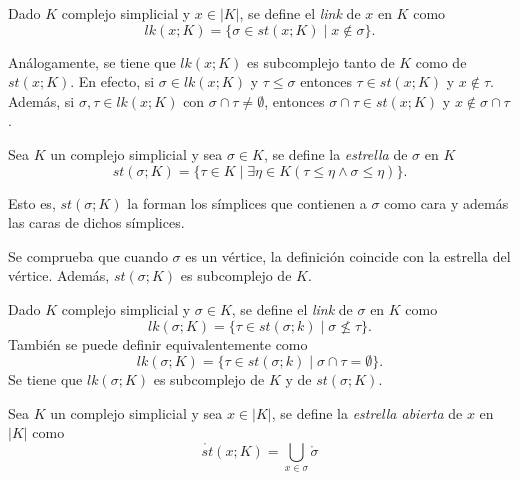 \documentclass[HS.tex]{subfiles}
\begin{document}
\begin{defi}
Dado $K$ complejo simplicial y $x\in |K|$, se define el \emph{link} de $x$ en $K$ como
\[
lk(x;K)=\{\sigma\in st(x;K)\mid x\notin\sigma\}.
\]
\end{defi}

\begin{nota}
Análogamente, se tiene que $lk(x;K)$ es subcomplejo tanto de $K$ como de $st(x;K)$. En efecto, si $\sigma\in lk(x;K)$ y $\tau\leq\sigma$ entonces $\tau\in st(x;K)$ y $x\notin \tau$. Además, si $\sigma,\tau\in lk(x;K)$ con $\sigma\cap\tau\neq\emptyset$, entonces $\sigma\cap\tau\in st(x;K)$ y $x\notin\sigma\cap\tau$. 
\end{nota}

\begin{defi}
Sea $K$ un complejo simplicial y sea $\sigma\in K$, se define la \emph{estrella} de $\sigma$ en $K$
\[
st(\sigma;K)=\{\tau\in K\mid \exists\eta\in K (\tau\leq\eta\land \sigma\leq\eta)\}.
\]

Esto es, $st(\sigma;K)$ la forman los símplices que contienen a $\sigma$ como cara y además las caras de dichos símplices.
\end{defi}

\begin{nota}
Se comprueba que cuando $\sigma$ es un vértice, la definición coincide con la estrella del vértice. Además, $st(\sigma;K)$ es subcomplejo de $K$. 
\end{nota}

\begin{defi}
Dado $K$ complejo simplicial y $\sigma\in K$, se define el \emph{link} de $\sigma$ en $K$ como
\[
lk(\sigma;K)=\{\tau\in st(\sigma;k)\mid \sigma\not\leq \tau\}.
\]
También se puede definir equivalentemente como 
\[
lk(\sigma;K)=\{\tau\in st(\sigma;k)\mid \sigma\cap \tau=\emptyset\}.
\]
Se tiene que $lk(\sigma;K)$ es subcomplejo de $K$ y de $st(\sigma;K)$.
\end{defi}

\begin{defi}
Sea $K$ un complejo simplicial y sea $x\in|K|$, se define la \emph{estrella abierta} de $x$ en $|K|$ como
\[
\mathring{st}(x;K)=\bigcup_{x\in\sigma}\mathring{\sigma}
\]
\end{defi}
\end{document}
